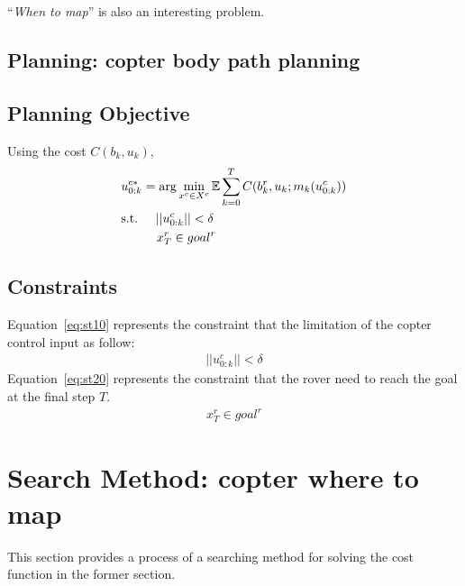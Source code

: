 \documentclass[conference]{IEEEtran}
\begin{document}
``{\it When to map}'' is also an interesting problem.
\textcolor[gray]{0.5}{
\section{Planning: copter body path planning}
\subsection{Planning Objective}
Using the cost $C(b_k, u_k)$,
\begin{align}
    &u^{c*}_{0:k}=\arg\min_{x^c \in X^c} \mathbb{E} \sum^T_{k=0} C(b^r_k, u_k; m_k (u^c_{0:k}))\\
    &{\rm s.t.} \hspace{5mm} ||u^c_{0:k}||< \delta\label{eq:st10}\\
    &\hspace{10mm} x^r_T \in goal^r\label{eq:st20}
\end{align}
}
\textcolor[gray]{0.5}{
\subsection{Constraints}
Equation~\eqref{eq:st10} represents the constraint that the limitation of the copter control input as follow:
\begin{align}
    ||u^c_{0:k}||< \delta
\end{align}
Equation~\eqref{eq:st20} represents the constraint that the rover need to reach the goal at the final step $T$.
\begin{align}
    x^r_T \in goal^r
\end{align}
}
\section{Search Method: copter where to map}
This section provides a process of a searching method for solving the cost function in the former section.
\end{document}
